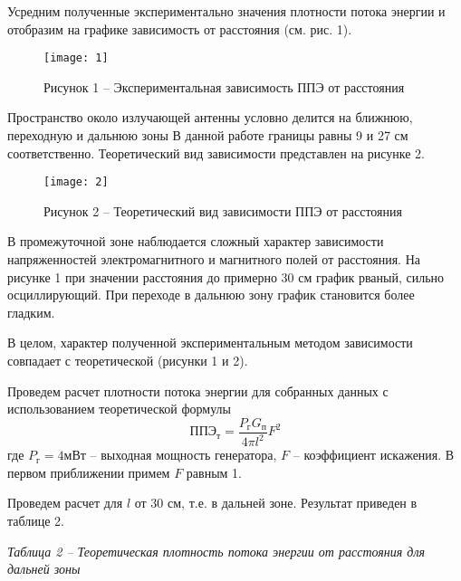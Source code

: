 Усредним полученные экспериментально значения плотности потока энергии и отобразим
на графике зависимость от расстояния (см. рис. 1).

\begin{figure}[H]
    \centering
    \texttt{[image: 1]}
    \caption*{Рисунок 1 -- Экспериментальная зависимость ППЭ от расстояния}
    \label{fig:1}
\end{figure}

Пространство около излучающей антенны условно делится на ближнюю, переходную и дальнюю зоны
В данной работе границы равны 9 и 27 см соответственно.
Теоретический вид зависимости представлен на рисунке 2.

\begin{figure}[H]
    \centering
    \texttt{[image: 2]}
    \caption*{Рисунок 2 -- Теоретический вид зависимости ППЭ от расстояния}
    \label{fig:2}
\end{figure}

В промежуточной зоне наблюдается сложный характер зависимости напряженностей
электромагнитного и магнитного полей от расстояния.
На рисунке 1 при значении расстояния до примерно 30 см график рваный, сильно осциллирующий.
При переходе в дальнюю зону график становится более гладким.

В целом, характер полученной экспериментальным методом зависимости совпадает
с теоретической (рисунки 1 и 2).

Проведем расчет плотности потока энергии для собранных данных с использованием
теоретической формулы
\begin{displaymath}
    \text{ППЭ}_\text{т} = \frac{P_{\text{г}} G_{\text{п}}}{4\pi l^2} F^2
\end{displaymath}
где $P_{\text{г}} = 4 \text{мВт}$ -- выходная мощность генератора, $F$ -- коэффициент
искажения.
В первом приближении примем $F$ равным 1.

Проведем расчет для $l$ от 30 см, т.е. в дальней зоне.
Результат приведен в таблице 2.

\pagebreak
\noindent\textit{Таблица 2 -- Теоретическая плотность потока энергии от расстояния для дальней зоны}

